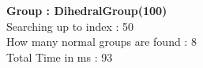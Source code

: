 \textbf{Group : DihedralGroup(100)}\\
Searching up to index : 50\\
How many normal groups are found : 8\\
Total Time in ms : 93\\
